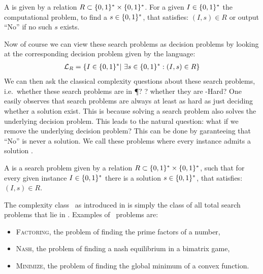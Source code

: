 \begin{definition}
    A  is given by a relation $R\subset \{0, 1\}^* \times \{0, 1\}^*$. For a given  $I\in \{0, 1\}^*$ the computational problem, to find a  $s \in \{0, 1\}^*$, that satisfies: $(I, s) \in R$ or output ``No'' if no such $s$ exists.
\end{definition}
Now of course we can view these search problems as decision problems by looking at the corresponding decision problem given by the language:
\begin{align*}
    \mathcal{L}_R = \{ I \in \{0, 1\}^* |\ \exists s \in \{0, 1\}^* : (I, s) \in R\}
\end{align*}
We can then ask the classical complexity questions about these search problems, i.e.~whether these search problems are in \P{}? \NP{}? whether they are
\NP-Hard?
One easily observes that search problems are always at least as hard as just deciding whether a solution exist.
This is because solving a search problem also solves the underlying decision problem.
This leads to the natural question: what if we remove the underlying decision problem?
This can be done by garanteeing that ``No'' is never a solution.
We call these problems where every instance admits a solution .
\begin{definition}
    A  is a search problem given by a relation $R\subset \{0, 1\}^* \times \{0, 1\}^*$, such that for every given instance $I\in
        \{0, 1\}^*$ there is a solution $s \in \{0, 1\}^*$, that satisfies: $(I, s) \in R$.
\end{definition}
The complexity class \TFNP\ as introduced in  is simply the class of all total search problems that lie in \NP{}.
Examples of \TFNP\ problems are:
\begin{itemize}
    \item \textsc{Factoring}, the problem of finding the prime factors of a number,
    \item \textsc{Nash}, the problem of finding a nash equilibrium in a bimatrix game,
    \item \textsc{Minimize}, the problem of finding the global minimum of a convex function.
\end{itemize}
